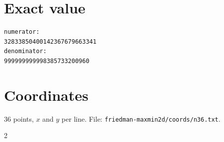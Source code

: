 \documentclass[11pt,a4paper]{article}
\begin{document}
\appendix
\section{Exact value}
{\small
\begin{verbatim}
numerator:
32833850400142367679663341
denominator:
999999999998385733200960
\end{verbatim}}

\section{Coordinates}
36 points, $x$ and $y$ per line. File: \texttt{friedman-maxmin2d/coords/n36.txt}.
{\tiny
\begin{multicols}{2}
\end{multicols}}
\end{document}
